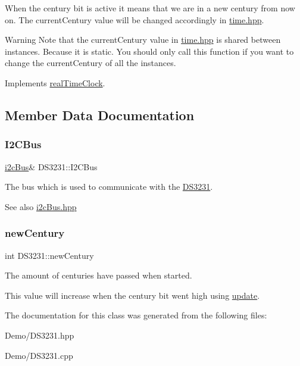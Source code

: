 When the century bit is active it means that we are in a new century from now on. The current\+Century value will be changed accordingly in \mbox{\hyperlink{time_8hpp_source}{time.\+hpp}}. \begin{DoxyWarning}{Warning}
Note that the current\+Century value in \mbox{\hyperlink{time_8hpp_source}{time.\+hpp}} is shared between instances. Because it is static. You should only call this function if you want to change the current\+Century of all the instances. 
\end{DoxyWarning}


Implements \mbox{\hyperlink{classreal_time_clock_afb5132ca3cbe80552a88041cead0a2b3}{real\+Time\+Clock}}.



\subsection{Member Data Documentation}
\mbox{\label{class_d_s3231_acffbcfc655349fd392b97dff5f18a56f}} 
\subsubsection{\texorpdfstring{I2\+C\+Bus}{I2CBus}}
{\footnotesize\ttfamily \mbox{\hyperlink{classi2c_bus}{i2c\+Bus}}\& D\+S3231\+::\+I2\+C\+Bus\hspace{0.3cm}{\ttfamily [private]}}



The bus which is used to communicate with the \mbox{\hyperlink{class_d_s3231}{D\+S3231}}. 

\begin{DoxySeeAlso}{See also}
\mbox{\hyperlink{i2c_bus_8hpp_source}{i2c\+Bus.\+hpp}} 
\end{DoxySeeAlso}
\mbox{\label{class_d_s3231_a15fb987b624cdddde40a15db36665221}} 
\subsubsection{\texorpdfstring{new\+Century}{newCentury}}
{\footnotesize\ttfamily int D\+S3231\+::new\+Century\hspace{0.3cm}{\ttfamily [private]}}



The amount of centuries have passed when started. 

This value will increase when the century bit went high using \mbox{\hyperlink{class_d_s3231_a143ec57122d892ea0ec671a153352f2c}{update}}. 

The documentation for this class was generated from the following files\+:\begin{DoxyCompactItemize}
\item 
Demo/D\+S3231.\+hpp\item 
Demo/D\+S3231.\+cpp\end{DoxyCompactItemize}
